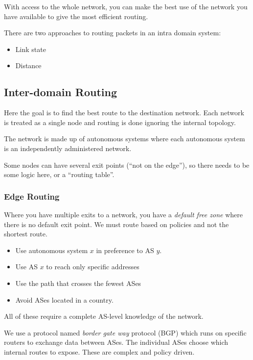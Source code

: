 With access to the whole network, you can make the best use of the network you have available to give the most efficient routing.

There are two approaches to routing packets in an intra domain system:
\begin{itemize}
    \item Link state
    \item Distance
\end{itemize}

\subsection{Inter-domain Routing}\label{sub:inter_domain_routing}

Here the goal is to find the best route to the destination network.
Each network is treated as a single node and routing is done ignoring the internal topology.

The network is made up of autonomous systems where each autonomous system is an independently administered network.

\begin{note}
    Some nodes can have several exit points (``not on the edge''), so there needs to be some logic here, or a ``routing table''.
\end{note}

\subsubsection{Edge Routing}\label{ssub:edge_routing}

Where you have multiple exits to a network, you have a \emph{default free zone} where there is no default exit point.
We must route based on policies and not the shortest route.
\begin{itemize}
    \item Use autonomous system \(x\) in preference to AS \(y\).
    \item Use AS \(x\) to reach only specific addresses
    \item Use the path that crosses the fewest ASes
    \item Avoid ASes located in a country.
\end{itemize}
All of these require a complete AS-level knowledge of the network.

We use a protocol named \emph{border gate way} protocol (BGP) which runs on specific routers to exchange data between ASes.
The individual ASes choose which internal routes to expose.
These are complex and policy driven.

